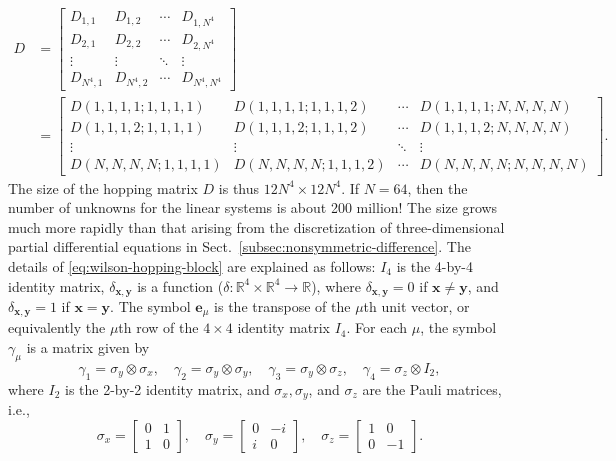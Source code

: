 \[\begin{aligned}
D&=\begin{bmatrix}D_{1,1}&D_{1,2}&\cdots&D_{1,N^4}\\D_{2,1}&D_{2,2}&\cdots&D_{2,N^4}\\\vdots&\vdots&\ddots&\vdots\\D_{N^4,1}&D_{N^4,2}&\cdots&D_{N^4,N^4}\end{bmatrix}\\
&=\begin{bmatrix}
D(1,1,1,1;1,1,1,1)&D(1,1,1,1;1,1,1,2)&\cdots&D(1,1,1,1;N,N,N,N)\\
D(1,1,1,2;1,1,1,1)&D(1,1,1,2;1,1,1,2)&\cdots&D(1,1,1,2;N,N,N,N)\\
\vdots&\vdots&\ddots&\vdots\\
D(N,N,N,N;1,1,1,1)&D(N,N,N,N;1,1,1,2)&\cdots&D(N,N,N,N;N,N,N,N)
\end{bmatrix}.
\end{aligned}\]
{The size of the hopping matrix $D$ is thus $12N^4\times12N^4$. If $N=64$, then the number of unknowns for the linear systems is about 200 million! The size grows much more rapidly than that arising from the discretization of three-dimensional partial differential equations in Sect.\ \ref{subsec:nonsymmetric-difference}.}
{The details of \eqref{eq:wilson-hopping-block} are explained as follows: $I_4$ is the 4-by-4 identity matrix, $\delta_{\boldsymbol{x},\boldsymbol{y}}$ is a function ($\delta:\mathbb{R}^4\times\mathbb{R}^4\to\mathbb{R}$), where $\delta_{\boldsymbol{x},\boldsymbol{y}}=0$ if $\boldsymbol{x}\ne\boldsymbol{y}$, and $\delta_{\boldsymbol{x},\boldsymbol{y}}=1$ if $\boldsymbol{x}=\boldsymbol{y}$. The symbol $\boldsymbol{e}_\mu$ is the transpose of the $\mu$th unit vector, or equivalently the $\mu$th row of the $4\times4$ identity matrix $I_4$. For each $\mu$, the symbol $\gamma_\mu$ is a matrix given by}
\[\gamma_1=\sigma_y\otimes\sigma_x,\quad\gamma_2=\sigma_y\otimes\sigma_y,\quad\gamma_3=\sigma_y\otimes\sigma_z,\quad\gamma_4=\sigma_z\otimes I_2,\]
{where $I_2$ is the 2-by-2 identity matrix, and $\sigma_x,\sigma_y$, and $\sigma_z$ are the Pauli matrices, i.e.,}
\[\sigma_x=\begin{bmatrix}0&1\\1&0\end{bmatrix},\quad\sigma_y=\begin{bmatrix}0&-i\\i&0\end{bmatrix},\quad\sigma_z=\begin{bmatrix}1&0\\0&-1\end{bmatrix}.\]
